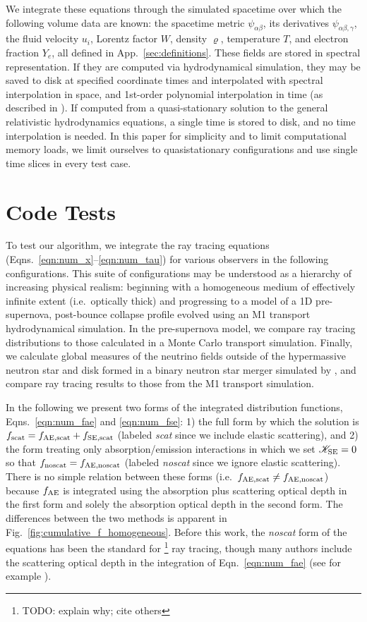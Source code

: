 \documentclass[aps,floatfix,prd,superscriptaddress,twocolumn]{revtex4-1}
\begin{document}
We integrate these equations through the simulated spacetime
over which the following volume data are known:
the spacetime metric $\psi_{\alpha\beta}$,
its derivatives $\psi_{\alpha\beta,\gamma}$,
the fluid velocity $u_i$,
Lorentz factor $W$,
density $\varrho$,
temperature $T$,
and electron fraction $Y_e$,
all defined in App.~\ref{sec:definitions}.
These fields are stored in spectral representation.
If they are computed via hydrodynamical simulation, they may be saved to disk
at specified coordinate times and interpolated
with spectral interpolation in space,
and 1st-order polynomial interpolation in time
(as described in \cite[App.~B]{bohn2016-code}).
If computed from a quasi-stationary solution to the
general relativistic hydrodynamics equations,
a single time is stored to disk, and no time interpolation is needed.
In this paper for simplicity and to limit computational memory loads,
we limit ourselves to quasistationary configurations
and use single time slices in every test case.

\section{Code Tests}
\label{sec:tests}

To test our algorithm, we integrate the ray tracing equations
(Eqns.~\ref{eqn:num_x}--\ref{eqn:num_tau}) for various observers
in the following configurations. This suite of configurations
may be understood as a hierarchy of increasing physical realism:
beginning with a homogeneous medium of effectively
infinite extent (i.e.\ optically thick) and progressing to a model of a
1D pre-supernova, post-bounce collapse profile
evolved using an M1 transport hydrodynamical simulation.
In the pre-supernova model, we compare ray tracing distributions
to those calculated in a Monte Carlo transport simulation.
Finally, we calculate global measures of the neutrino fields outside of the
hypermassive neutron star and disk formed in a binary neutron star
merger simulated by \cite{fouc2016-m1_nsns, fouc2016-m1_evolve_n},
and compare ray tracing results to those from the M1 transport simulation.

In the following we present two forms of the integrated distribution functions,
Eqns.~\ref{eqn:num_fae} and \ref{eqn:num_fse}:
1) the full form  by which the solution is $f_{\rm scat}=f_{\rm AE,scat}+f_{\rm SE,scat}$
(labeled \emph{scat} since we include elastic scattering), and
2) the form treating only absorption/emission interactions
in which we set $\mathscr{K}_{\rm SE}=0$ so that $f_{\rm noscat}=f_{\rm AE,noscat}$
(labeled \emph{noscat} since we ignore elastic scattering).
There is no simple relation between these forms
(i.e.\ $f_{\rm AE,scat} \neq f_{\rm AE,noscat}$)
because $f_{\rm AE}$ is integrated using the absorption plus scattering optical depth
in the first form and solely the absorption optical depth in the second form.
The differences between the two methods is apparent
in Fig.~\ref{fig:cumulative_f_homogeneous}.
Before this work, the \emph{noscat} form of the equations has been the standard for
\footnote{TODO: explain why; cite others}
ray tracing, though many authors include the scattering optical depth in
the integration of Eqn.~\ref{eqn:num_fae}
(see for example \cite{hari2010-gr_nunubar_collapsar}).
\end{document}
